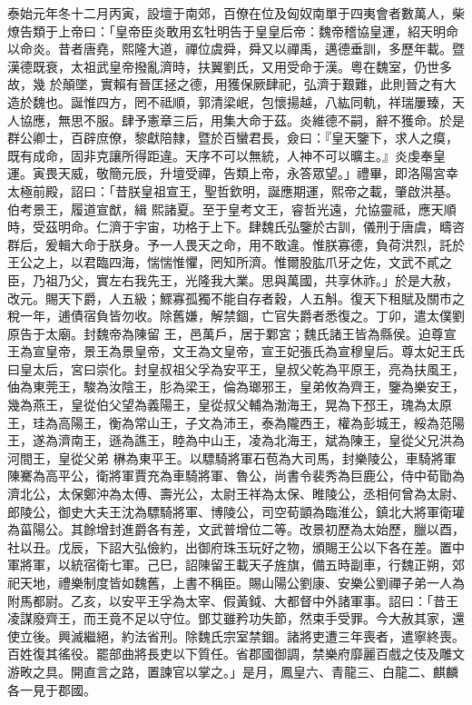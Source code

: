 \begin{pinyinscope}
 泰始元年冬十二月丙寅，設壇于南郊，百僚在位及匈奴南單于四夷會者數萬人，柴燎告類于上帝曰：「皇帝臣炎敢用玄牡明告于皇皇后帝：魏帝稽協皇運，紹天明命以命炎。昔者唐堯，熙隆大道，禪位虞舜，舜又以禪禹，邁德垂訓，多歷年載。暨漢德既衰，太祖武皇帝撥亂濟時，扶翼劉氏，又用受命于漢。粵在魏室，仍世多故，幾
 於顛墜，實賴有晉匡拯之德，用獲保厥肆祀，弘濟于艱難，此則晉之有大造於魏也。誕惟四方，罔不祗順，郭清梁岷，包懷揚越，八紘同軌，祥瑞屢臻，天人協應，無思不服。肆予憲章三后，用集大命于茲。炎維德不嗣，辭不獲命。於是群公卿士，百辟庶僚，黎獻陪隸，暨於百蠻君長，僉曰：『皇天鑒下，求人之瘼，既有成命，固非克讓所得距違。天序不可以無統，人神不可以曠主。』炎虔奉皇運。寅畏天威，敬簡元辰，升壇受禪，告類上帝，永答眾望。」禮畢，即洛陽宮幸太極前殿，詔曰：「昔朕皇祖宣王，聖哲欽明，誕應期運，熙帝之載，肇啟洪基。伯考景王，履道宣猷，緝
 熙諸夏。至于皇考文王，睿哲光遠，允協靈祗，應天順時，受茲明命。仁濟于宇宙，功格于上下。肆魏氏弘鑒於古訓，儀刑于唐虞，疇咨群后，爰輯大命于朕身。予一人畏天之命，用不敢違。惟朕寡德，負荷洪烈，託於王公之上，以君臨四海，惴惴惟懼，罔知所濟。惟爾股肱爪牙之佐，文武不貳之臣，乃祖乃父，實左右我先王，光隆我大業。思與萬國，共享休祚。」於是大赦，改元。賜天下爵，人五級；鰥寡孤獨不能自存者穀，人五斛。復天下租賦及關市之稅一年，逋債宿負皆勿收。除舊嫌，解禁錮，亡官失爵者悉復之。丁卯，遣太僕劉原告于太廟。封魏帝為陳留
 王，邑萬戶，居于鄴宮；魏氏諸王皆為縣侯。迫尊宣王為宣皇帝，景王為景皇帝，文王為文皇帝，宣王妃張氏為宣穆皇后。尊太妃王氏曰皇太后，宮曰崇化。封皇叔祖父孚為安平王，皇叔父乾為平原王，亮為扶風王，伷為東莞王，駿為汝陰王，肜為梁王，倫為瑯邪王，皇弟攸為齊王，鑒為樂安王，幾為燕王，皇從伯父望為義陽王，皇從叔父輔為渤海王，晃為下邳王，瑰為太原王，珪為高陽王，衡為常山王，子文為沛王，泰為隴西王，權為彭城王，綏為范陽王，遂為濟南王，遜為譙王，睦為中山王，凌為北海王，斌為陳王，皇從父兄洪為河間王，皇從父弟
 楙為東平王。以驃騎將軍石苞為大司馬，封樂陵公，車騎將軍陳騫為高平公，衛將軍賈充為車騎將軍、魯公，尚書令裴秀為巨鹿公，侍中荀勖為濟北公，太保鄭沖為太傅、壽光公，太尉王祥為太保、睢陵公，丞相何曾為太尉、郎陵公，御史大夫王沈為驃騎將軍、博陵公，司空荀顗為臨淮公，鎮北大將軍衛瓘為菑陽公。其餘增封進爵各有差，文武普增位二等。改景初歷為太始歷，臘以酉，社以丑。戊辰，下詔大弘儉約，出御府珠玉玩好之物，頒賜王公以下各在差。置中軍將軍，以統宿衛七軍。己巳，詔陳留王載天子旌旗，備五時副車，行魏正朔，郊
 祀天地，禮樂制度皆如魏舊，上書不稱臣。賜山陽公劉康、安樂公劉禪子弟一人為附馬都尉。乙亥，以安平王孚為太宰、假黃鉞、大都督中外諸軍事。詔曰：「昔王凌謀廢齊王，而王竟不足以守位。鄧艾雖矜功失節，然束手受罪。今大赦其家，還使立後。興滅繼絕，約法省刑。除魏氏宗室禁錮。諸將吏遭三年喪者，遣寧終喪。百姓復其徭役。罷部曲將長吏以下質任。省郡國御調，禁樂府靡麗百戲之伎及雕文游畋之具。開直言之路，置諫官以掌之。」是月，鳳皇六、青龍三、白龍二、麒麟各一見于郡國。




\end{pinyinscope}
